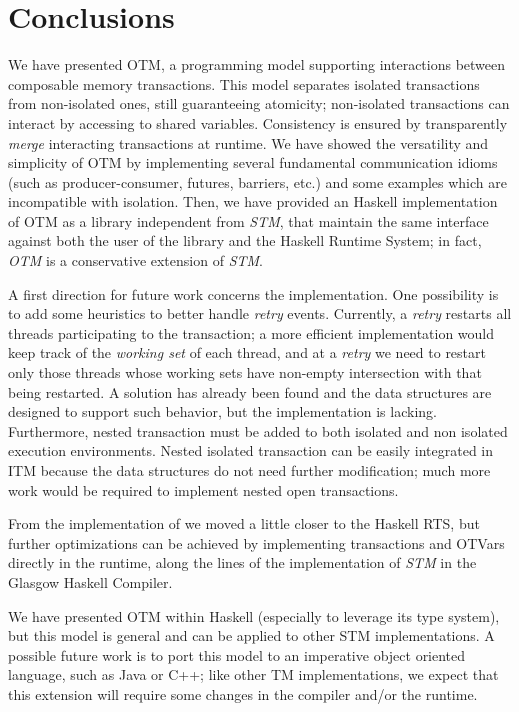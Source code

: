 
\chapter{Conclusions}

We have presented OTM, a programming model supporting  interactions between composable memory transactions.
This model separates isolated transactions from non-isolated ones, still guaranteeing atomicity; non-isolated transactions can interact by accessing to shared variables.
Consistency is ensured by transparently \emph{merge} interacting transactions at runtime.  
We have showed the versatility and simplicity of OTM by implementing several fundamental communication idioms (such as producer-consumer, futures, barriers, etc.) and some examples which are incompatible with isolation.
Then, we have provided an Haskell implementation of OTM as a library independent from \emph{STM}, that maintain the same interface against both the user of the library and the Haskell Runtime System; in fact, \emph{OTM} is a conservative extension of \emph{STM}.

A first direction for future work concerns the implementation.
One possibility is to add some heuristics to better handle \emph{retry} events.
Currently, a \emph{retry} restarts all threads participating to the transaction; a more efficient implementation would keep track of the \emph{working set} of each thread, and at a \emph{retry} we need to restart only those threads whose working sets have non-empty intersection with that being restarted.
A solution has already been found and the data structures are designed to support such behavior, but the implementation is lacking.
Furthermore, nested transaction must be added to both isolated and non isolated execution environments.
Nested isolated transaction can be easily integrated in ITM because the data structures do not need further modification; much more work would be required to implement nested open transactions.

From the implementation of \citet{Toneguzzo} we moved a little closer to the Haskell RTS, but further optimizations can be achieved by implementing transactions and OTVars directly in the runtime, along the lines of the implementation of \emph{STM} in the Glasgow Haskell Compiler.

We have presented OTM within Haskell (especially to leverage its type system), but this model is general and can be applied to other STM implementations. A possible future work is to port this model to an imperative object oriented language, such as Java or C++; like other TM implementations, we expect that this extension will require some changes in the compiler and/or the runtime. 